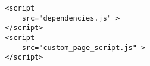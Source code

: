 \begin{lstlisting}[style=htmlcssjs]
<script 
	src="dependencies.js" >
</script>
<script 
	src="custom_page_script.js" >
</script>
\end{lstlisting}